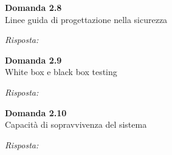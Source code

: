 \documentclass{article}
\newenvironment{problem}[2][Domanda]
    { \begin{mdframed}[backgroundcolor=gray!20] \textbf{#1 #2} \\}
    {  \end{mdframed}}
\newenvironment{solution}
    {\textit{Risposta:}}
    {}
\begin{document}
\begin{problem}{2.8}
Linee guida di progettazione nella sicurezza
\end{problem}
\begin{solution}

\end{solution}

\begin{problem}{2.9}
White box e black box testing
\end{problem}
\begin{solution}

\end{solution}

\begin{problem}{2.10}
Capacità di sopravvivenza del sistema
\end{problem}
\begin{solution}

\end{solution}
\end{document}
